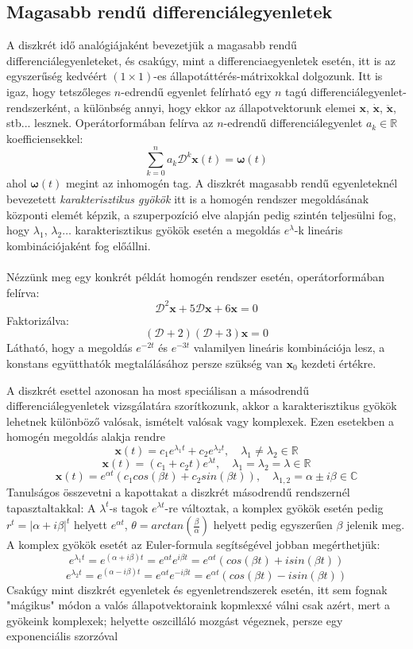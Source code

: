 \documentclass[14p]{article}
\begin{document}
\subsection{Magasabb rendű differenciálegyenletek}
A diszkrét idő analógiájaként bevezetjük a magasabb rendű differenciálegyenleteket, és csakúgy, mint a differenciaegyenletek esetén, itt is az egyszerűség kedvéért $(1 \times 1)$-es állapotáttérés-mátrixokkal dolgozunk. Itt is igaz, hogy tetszőleges $n$-edrendű egyenlet felírható egy $n$ tagú differenciálegyenlet-rendszerként, a különbség annyi, hogy ekkor az állapotvektorunk elemei $\pmb{x}$, $\dot{\pmb{x}}$, $\ddot{\pmb{x}}$, stb... lesznek.
Operátorformában felírva az $n$-edrendű differenciálegyenlet $a_k \in \mathbb{R}$ koefficiensekkel:
\[
	\sum_{k=0}^{n}{a_k\mathcal{D}^k\pmb{x}(t)} = \pmb{\omega}(t)
\]
ahol $\pmb{\omega}(t)$ megint az inhomogén tag.
A diszkrét magasabb rendű egyenleteknél bevezetett \emph{karakterisztikus gyökök} itt is a homogén rendszer megoldásának központi elemét képzik, a szuperpozíció elve alapján pedig szintén teljesülni fog, hogy $\lambda_1$, $\lambda_2 \dots$ karakterisztikus gyökök esetén a megoldás $e^{\lambda}$-k lineáris kombinációjaként fog előállni.
\\
\\
Nézzünk meg egy konkrét példát homogén rendszer esetén, operátorformában felírva: 
\[
	\mathcal{D}^2\pmb{x} + 5\mathcal{D}\pmb{x} + 6\pmb{x} = 0
\]
Faktorizálva:
\[
	(\mathcal{D}+2)(\mathcal{D}+3)\pmb{x} = 0
\]
Látható, hogy a megoldás $e^{-2t}$ és $e^{-3t}$ valamilyen lineáris kombinációja lesz, a konstans együtthatók megtalálásához persze szükség van $\pmb{x}_0$ kezdeti értékre.

A diszkrét esettel azonosan ha most speciálisan a másodrendű differenciálegyenletek vizsgálatára szorítkozunk, akkor a karakterisztikus gyökök lehetnek különböző valósak, ismételt valósak vagy komplexek. Ezen esetekben a homogén megoldás alakja rendre
\[
	\pmb{x}(t) = c_1e^{\lambda_1 t} + c_2e^{\lambda_2 t}, \quad \lambda_1 \ne \lambda_2 \in \mathbb{R}
\]
\[
	\pmb{x}(t) = (c_1 + c_2t)e^{\lambda t}, \quad \lambda_1 = \lambda_2 = \lambda \in \mathbb{R}
\]
\[
	\pmb{x}(t) = e^{\alpha t}(c_1 cos(\beta t) + c_2 sin(\beta t)), \quad \lambda_{1,2} = \alpha \pm i\beta \in \mathbb{C}
\]
Tanulságos összevetni a kapottakat a diszkrét másodrendű rendszernél tapasztaltakkal: A $\lambda^t$-s tagok $e^{\lambda t}$-re változtak, a komplex gyökök esetén pedig $r^t = |\alpha + i\beta|^t$ helyett $e^{\alpha t}$, $\theta = arctan(\frac{\beta}{\alpha})$ helyett pedig egyszerűen $\beta$ jelenik meg. A komplex gyökök esetét az Euler-formula segítségével jobban megérthetjük:
\[
	e^{\lambda_1 t} = e^{(\alpha + i\beta) t} = e^{\alpha t} e^{i\beta t} = e^{\alpha t}(cos(\beta t) + i sin(\beta t))
\]
\[
	e^{\lambda_2 t} = e^{(\alpha - i\beta) t} = e^{\alpha t} e^{-i\beta t} = e^{\alpha t}(cos(\beta t) - i sin(\beta t))
\]
Csakúgy mint diszkrét egyenletek és egyenletrendszerek esetén, itt sem fognak "mágikus" módon a valós állapotvektoraink kopmlexxé válni csak azért, mert a gyökeink komplexek; helyette oszcilláló mozgást végeznek, persze egy exponenciális szorzóval
\end{document}
